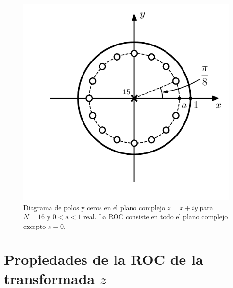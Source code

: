\documentclass[a4paper]{report}
\begin{document}
\begin{figure}[!htb]
  \begin{minipage}[c]{0.42\textwidth}
    \includegraphics[width=\textwidth]{figuras/example_3_6_zero_pole_plot.pdf}
  \end{minipage}\hfill
  \begin{minipage}[c]{0.48\textwidth}
    \caption{
      Diagrama de polos y ceros en el plano complejo \(z=x+iy\) para \(N=16\) y \(0<a<1\) real. La ROC consiste en todo el plano complejo excepto \(z=0\).
    }\label{fig:example_3_6_zero_pole_plot}
  \end{minipage}
\end{figure}

\section{Propiedades de la ROC de la transformada \texorpdfstring{\(z\)}{z}}
\end{document}
